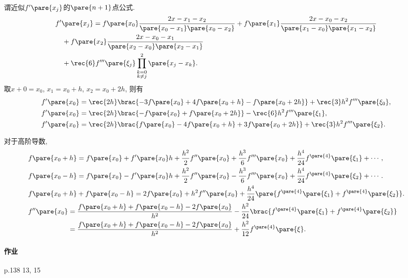 \documentclass[hidelinks]{ctexart}
\begin{document}
谓近似$f'\pare{x_j}$的$\pare{n+1}$点公式.
\begin{align*}
    & f'\pare{x_j} = f\pare{x_0} \frac{2x-x_1-x_2}{\pare{x_0-x_1}\pare{x_0-x_2}} + f\pare{x_1}\frac{2x-x_0-x_2}{\pare{x_1 - x_0}\pare{x_1 - x_2}}\\
    &\quad + f\pare{x_2}\frac{2x-x_0-x_1}{\pare{x_2 - x_0}\pare{x_2 - x_1}}\\
    &\quad + \rec{6}f'''\pare{\xi_j}\prod_{\substack{k=0\\k\neq j}}^2 \pare{x_j-x_k}.
\end{align*}
取$x+0 = x_0$, $x_1 = x_0 + h$, $x_2 = x_0 + 2h$, 则有
\begin{align*}
    & f'\pare{x_0} = \rec{2h}\brac{-3f\pare{x_0} + 4f\pare{x_0 + h} - f\pare{x_0 + 2h}} + \rec{3}h^2 f'''\pare{\xi_0}, \\
    & f'\pare{x_0} = \rec{2h}\brac{-f\pare{x_0} + f\pare{x_0 + 2h}} - \rec{6}h^2 f'''\pare{\xi_1}, \\
    & f'\pare{x_0} = \rec{2h}\brac{f\pare{x_0} - 4f\pare{x_0 + h} + 3f\pare{x_0 + 2h}} + \rec{3}h^2 f'''\pare{\xi_2}.
\end{align*}
\par
对于高阶导数,
\begin{align*}
    & f\pare{x_0 + h} = f\pare{x_0} + f'\pare{x_0}h + \frac{h^2}{2}f''\pare{x_0} + \frac{h^3}{6}f'''\pare{x_0} + \frac{h^4}{24}f^{\pare{4}}\pare{\xi_1} + \cdots, \\
    & f\pare{x_0 - h} = f\pare{x_0} - f'\pare{x_0}h + \frac{h^2}{2}f''\pare{x_0} - \frac{h^3}{6}f'''\pare{x_0} + \frac{h^4}{24}f^{\pare{4}}\pare{\xi_2} + \cdots. \\
    & f\pare{x_0 + h} + f\pare{x_0 - h} = 2f\pare{x_0} + h^2 f''\pare{x_0} + \frac{h^4}{24}\pare{f^{\pare{4}}\pare{\xi_1} + f^{\pare{4}}\pare{\xi_2}}. \\
    & f''\pare{x_0} = \frac{f\pare{x_0 + h} + f\pare{x_0 - h} - 2f\pare{x_0}}{h^2} - \frac{h^2}{24}\brac{f^{\pare{4}}\pare{\xi_1} + f^{\pare{4}}\pare{\xi_2}} \\
    & \phantom{f''\pare{x_0}} = \frac{f\pare{x_0 + h} + f\pare{x_0 - h} - 2f\pare{x_0}}{h^2} + \frac{h^2}{12}f^{\pare{4}}\pare{\xi}.
\end{align*}

\paragraph{作业} %
\label{par:作业}

p.138 13, 15
\end{document}
